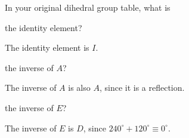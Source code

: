 \documentclass[../gatm_answers.tex]{subfiles}
\begin{document}
\begin{outer_problem}
\item In your original dihedral group table, what is
\end{outer_problem}

\begin{inner_problem}[start=1]
\item the identity element?
\end{inner_problem}

\noindent The identity element is $I$.

\begin{inner_problem}
\item the inverse of $A$?
\end{inner_problem}

\noindent The inverse of $A$ is also $A$, since it is a reflection.

\begin{inner_problem}
\item the inverse of $E$?
\end{inner_problem}

\noindent The inverse of $E$ is $D$, since $240^\circ+120^\circ\equiv 0^\circ$.
\end{document}
